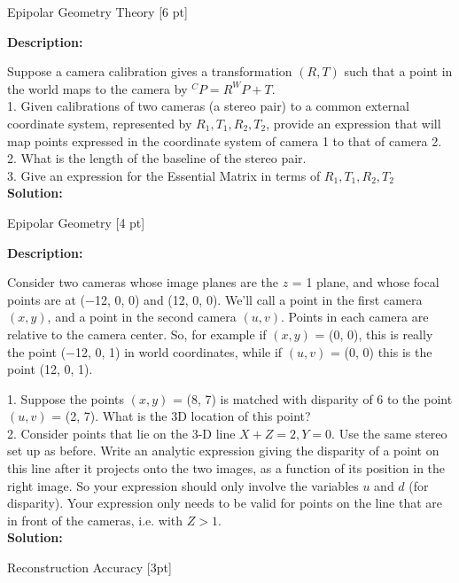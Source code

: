 \documentclass{assignment}
\date{November 2, 2016}
\begin{document}
\begin{problemlist}




\pbitem Epipolar Geometry Theory [6 pt]

\textbf{Description:}

Suppose a camera calibration gives a transformation $(R, T)$ such that a point in the world maps to the camera by $^{C}P = R^{W}P + T$.\\

1. Given calibrations of two cameras (a stereo pair) to a common external coordinate system, represented by $R_1, T_1, R_2, T_2$, provide an expression that will map points expressed in the coordinate system of camera 1 to that of camera 2.\\
2. What is the length of the baseline of the stereo pair.\\
3. Give an expression for the Essential Matrix in terms of $R_1, T_1, R_2, T_2$\\

\textbf{Solution:}

\newpage
\pbitem Epipolar Geometry [4 pt]

\textbf{Description:}

Consider two cameras whose image planes are the $z$ = 1 plane, and whose focal points are at (−12, 0, 0) and (12, 0, 0). We’ll call a point in the first camera $(x, y)$, and a point in the second camera $(u, v)$. Points in each camera are relative to the camera center. So, for example if $(x, y)$ = (0, 0), this is really the point (−12, 0, 1) in world coordinates, while if $(u, v)$ = (0, 0) this is the point (12, 0, 1).


1. Suppose the points $(x, y)$ = (8, 7) is matched with disparity of 6 to the point $(u, v)$ = (2, 7). What is the 3D location of this point?\\

2. Consider points that lie on the 3-D line $X + Z = 2,Y = 0$. Use the same stereo set up as before. Write an analytic expression giving the disparity of a point on this line after it projects onto the two images, as a function of its position in the right image. So your expression should only involve the variables $u$ and $d$ (for disparity). Your expression only needs to be valid for points on the line that are in front of the cameras, i.e. with $Z > 1$.\\

\textbf{Solution:}


\newpage
\pbitem Reconstruction Accuracy [3pt]


\end{problemlist}
\end{document}
